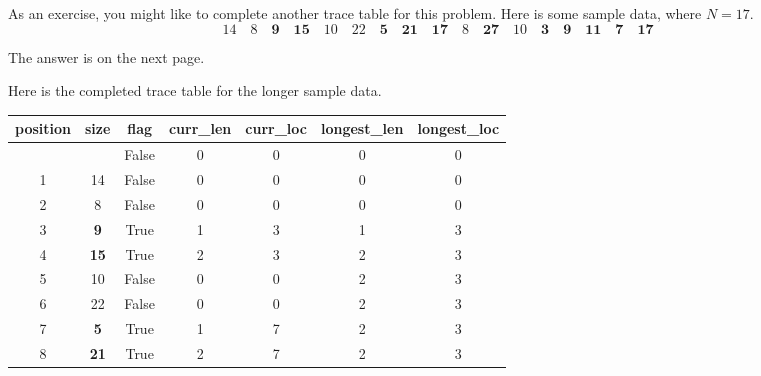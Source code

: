As an exercise, you might like to complete another trace table for this problem. Here is
some sample data, where $N=17$.\[
  14 \quad 8 \quad 
  \mathbf{9} \quad \mathbf{15} \quad
  10 \quad 22 \quad 
  \mathbf{5} \quad \mathbf{21} \quad \mathbf{17} \quad 
  8 \quad
  \mathbf{27} \quad
  10 \quad
  \mathbf{3} \quad \mathbf{9} \quad \mathbf{11} \quad \mathbf{7} \quad \mathbf{17}
\]

The answer is on the next page.


\clearpage %

Here is the completed trace table for the longer sample data.

\begin{inlinetable}
  \begin{tabular}{S[table-format=2.0] S[table-format=2.0] c S[table-format=2.0]
    S[table-format=2.0] S[table-format=2.0] S[table-format=2.0]}
    \toprule
    {position} & {size}       & {f{}lag} & {curr\_len} & {curr\_loc} & {longest\_len} & {longest\_loc} \\
    \midrule                             
               &              & False    & 0           & 0           & 0              & 0              \\
    1          & 14           & False    & 0           & 0           & 0              & 0              \\
    2          & 8            & False    & 0           & 0           & 0              & 0              \\
    3          & \bfseries 9  & True     & 1           & 3           & 1              & 3              \\
    4          & \bfseries 15 & True     & 2           & 3           & 2              & 3              \\
    5          & 10           & False    & 0           & 0           & 2              & 3              \\
    6          & 22           & False    & 0           & 0           & 2              & 3              \\
    7          & \bfseries 5  & True     & 1           & 7           & 2              & 3              \\
    8          & \bfseries 21 & True     & 2           & 7           & 2              & 3              \\

\end{tabular}
\end{inlinetable}
